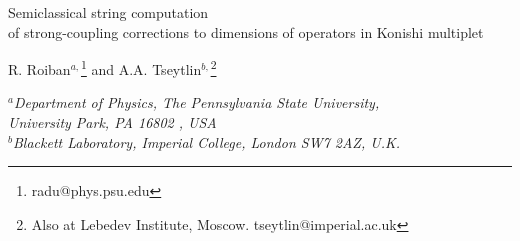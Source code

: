 \documentclass[12pt]{article}
\begin{document}

\overfullrule=0pt
\parskip=2pt
\parindent=12pt
\headheight=0in \headsep=0in \topmargin=0in \oddsidemargin=0in

\vspace{ -3cm}
\thispagestyle{empty}
\vspace{-1cm}




\begin{center}
\vspace{1cm}
{\Large\bf  

Semiclassical string computation  \\
 of  strong-coupling corrections  to  
dimensions   of operators in  Konishi multiplet
 

\vspace{1.2cm}


   }

\vspace{.2cm}
 {
R. Roiban$^{a,}$\footnote{radu@phys.psu.edu} and
 A.A. Tseytlin$^{b,}$\footnote{Also at Lebedev  Institute, Moscow. tseytlin@imperial.ac.uk }}\\

\vskip 0.6cm


{\em 
$^{a}$Department of Physics, The Pennsylvania  State University,\\
University Park, PA 16802 , USA\\
\vskip 0.08cm
\vskip 0.08cm $^{b}$Blackett Laboratory, Imperial College,
London SW7 2AZ, U.K.
 }


\vspace{.2cm}


\end{center}
\end{document}

